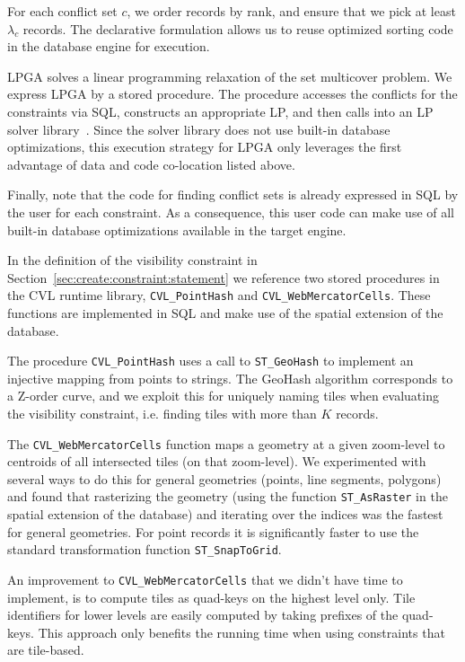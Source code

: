 For each conflict set $c$, we order records by rank, and ensure that we pick at least $\lambda_c$ records. The declarative formulation allows us to reuse optimized sorting code in the database engine for execution.

LPGA solves a linear programming relaxation of the set multicover problem. We express LPGA by a stored procedure. The procedure accesses the conflicts for the constraints via SQL, constructs an appropriate LP, and then calls into an LP solver library~\cite{cvxopt}. Since the solver library does not use built-in database optimizations, this execution strategy for LPGA only leverages the first advantage of data and code co-location listed above.

Finally, note that the code for finding conflict sets is already expressed in SQL by the user for each constraint. As a consequence, this user code can make use of all built-in database optimizations available in the target engine.

In the definition of the visibility constraint in Section~\ref{sec:create:constraint:statement} we reference two stored procedures in the CVL runtime library, \texttt{CVL\_PointHash} and \texttt{CVL\_WebMercatorCells}. These functions are implemented in SQL and make use of the spatial extension of the database.

The procedure \texttt{CVL\_PointHash} uses a call to \texttt{ST\_GeoHash} to implement an injective mapping from points to strings. The GeoHash algorithm corresponds to a Z-order curve, and we exploit this for uniquely naming tiles when evaluating the visibility constraint, i.e. finding tiles with more than $K$ records.

The \texttt{CVL\_WebMercatorCells} function maps a geometry at a given zoom-level to centroids of all intersected tiles (on that zoom-level). We experimented with several ways to do this for general geometries (points, line segments, polygons) and found that rasterizing the geometry (using the function \texttt{ST\_AsRaster} in the spatial extension of the database) and iterating over the indices was the fastest for general geometries. For point records it is significantly faster to use the standard transformation function \texttt{ST\_SnapToGrid}.

An improvement to \texttt{CVL\_WebMercatorCells} that we didn't have time to implement, is to compute tiles as quad-keys on the highest level only. Tile identifiers for lower levels are easily computed by taking prefixes of the quad-keys. This approach only benefits the running time when using constraints that are tile-based.

